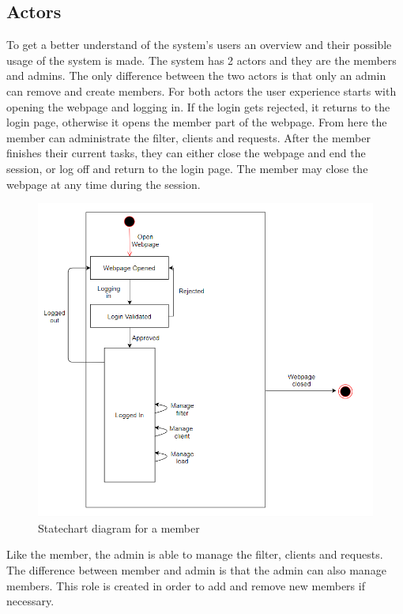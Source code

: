 \subsection{Actors}
To get a better understand of the system's users an overview and their possible usage of the system is made. The system has 2 actors and they are the members and admins. The only difference between the two actors is that only an admin can remove and create members.
\newline \newline \noindent
For both actors the user experience starts with opening the webpage and logging in. If the login gets rejected, it returns to the login page, otherwise it opens the member part of the webpage. From here the member can administrate the filter, clients and requests. After the member finishes their current tasks, they can either close the webpage and end the session, or log off and return to the login page. The member may close the webpage at any time during the session.
\newline
\begin{figure}[H]
    \centering
    \includegraphics[scale=.7, clip]{figures/useCaseMember.png}
    \caption{Statechart diagram for a member}
    \label{fig:useCaseMember}
\end{figure}
\noindent
Like the member, the admin is able to manage the filter, clients and requests. The difference between member and admin is that the admin can also manage members. This role is created in order to add and remove new members if necessary. 
